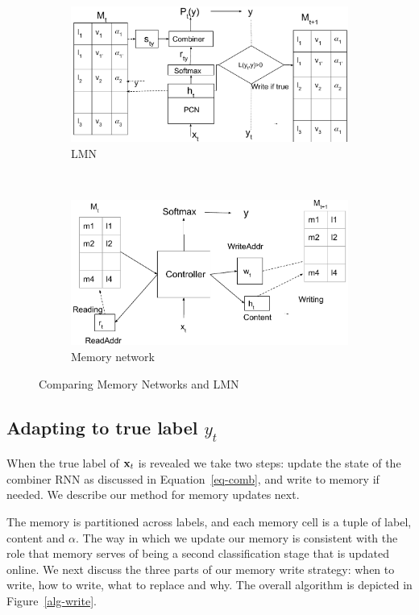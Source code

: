 \documentclass[letterpaper]{article} %
\newcommand{\vek}[1]{{\bf {#1}}}
\newcommand{\vx}{{\vek{x}}}
\def\shiv#1{\todo [color=orange]{Shiv: #1}}
\newcommand{\rulesep}{\unskip\ \vrule\ }
\begin{document}
\begin{figure}
\begin{subfigure}[b]{0.5\textwidth}
\begin{center}
\includegraphics[width=0.9\hsize]{lmn.pdf}
\caption{LMN}
\label{fig:lmn}
\end{center}
\end{subfigure}
\rulesep
\begin{subfigure}[b]{0.5\textwidth}
\begin{center}
\includegraphics[width=0.9\hsize]{mem_net.pdf}
\caption{Memory network}
\label{fig:mem_net}
\end{center}
\end{subfigure}
\caption{Comparing Memory Networks and LMN}
\label{fig:net_comparison}
\end{figure}



\subsection{Adapting to true label $y_t$}
When the true label of $\vx_t$ is revealed we take two steps: update the state of the combiner RNN as discussed in Equation~\ref{eq-comb}, and write to memory if needed.  We describe our method for memory updates next.

The memory is partitioned across labels, and each memory cell is a tuple of label, content and $\alpha$.  %
The way in which we update our memory is consistent with the role that memory serves of being a second classification stage that is updated online.  We next discuss the three parts of our memory write strategy: when to write, how to write, what to replace and why. The overall algorithm is depicted in Figure~\ref{alg-write}.
\end{document}
